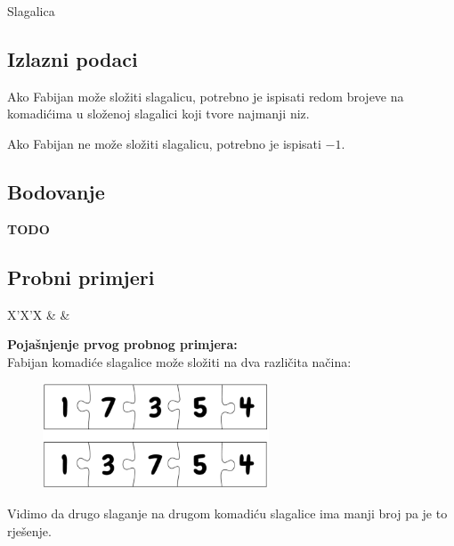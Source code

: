 \begin{statement}[
  problempoints=70,
  timelimit=1 sekunda,
  memorylimit=512 MiB,
]{Slagalica}
\subsection*{Izlazni podaci}
Ako Fabijan može složiti slagalicu, potrebno je ispisati redom brojeve na
komadićima u složenoj slagalici koji tvore najmanji niz.

Ako Fabijan ne može složiti slagalicu, potrebno je ispisati $-1$.

\subsection*{Bodovanje}
\textbf{TODO}

\subsection*{Probni primjeri}
\begin{tabularx}{\textwidth}{X'X'X}
 &
 &
\end{tabularx}

\textbf{Pojašnjenje prvog probnog primjera:}\\
Fabijan komadiće slagalice može složiti na dva različita načina:\\

\begin{figure}[H]
\centering
\includegraphics[width=0.6\textwidth]{img/sample_clarification.png}
\end{figure}
Vidimo da drugo slaganje na drugom komadiću slagalice ima manji broj pa je to
rješenje.

\end{statement}

